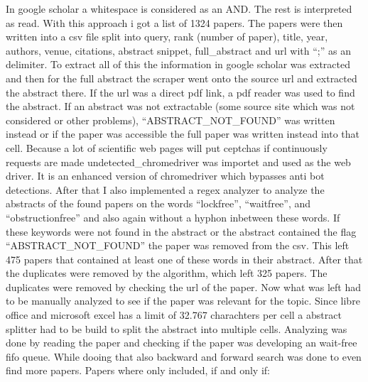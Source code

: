 In google scholar a whitespace is considered as an AND. The rest is interpreted as read. With this approach i got a list of 1324 papers. The papers were then written into a csv file split into query, rank (number of paper), title, year, authors, venue, citations, abstract snippet, full\_abstract and url with \enquote{;} as an delimiter. To extract all of this the information in google scholar was extracted and then for the full abstract the scraper went onto the source url and extracted the abstract there. If the url was a direct pdf link, a pdf reader was used to find the abstract. If an abstract was not extractable (some source site which was not considered or other problems), \enquote{ABSTRACT\_NOT\_FOUND} was written instead or if the paper was accessible the full paper was written instead into that cell. Because a lot of scientific web pages will put ceptchas if continuously requests are made undetected\_chromedriver was importet and used as the web driver. It is an enhanced version of chromedriver which bypasses anti bot detections. After that I also implemented a regex analyzer to analyze the abstracts of the found papers on the words \enquote{lock\-free}, \enquote{wait\-free}, and \enquote{obstruction\-free} and also again without a hyphon inbetween these words. If these keywords were not found in the abstract or the abstract contained the flag \enquote{ABSTRACT\_NOT\_FOUND} the paper was removed from the csv. This left 475 papers that contained at least one of these words in their abstract. After that the duplicates were removed by the algorithm, which left 325 papers. The duplicates were removed by checking the url of the paper. Now what was left had to be manually analyzed to see if the paper was relevant for the topic. Since libre office and microsoft excel has a limit of 32.767 charachters per cell a abstract splitter had to be build to split the abstract into multiple cells. Analyzing was done by reading the paper and checking if the paper was developing an wait-free fifo queue. While dooing that also backward and forward search was done to even find more papers. Papers where only included, if and only if: 
